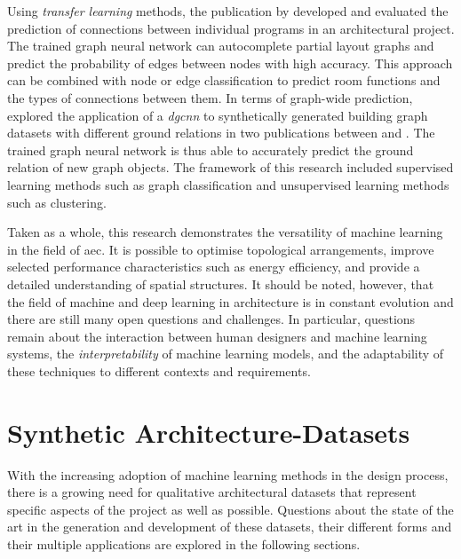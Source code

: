 \documentclass[a4paper, 12pt]{report}
\begin{document}
Using \textit{transfer learning} methods, the publication  by \citeauthor{eisenstadt2022autocompletion} developed and evaluated the prediction of connections between individual programs in an architectural project. The trained graph neural network can autocomplete partial layout graphs and predict the probability of edges between nodes with high accuracy. This approach can be combined with node or edge classification to predict room functions and the types of connections between them. In terms of graph-wide prediction, \citeauthor{alymani2022graph} explored the application of a \textit{\acrlong{dgcnn}} to synthetically generated building graph datasets with different ground relations in two publications between \citeyear{alymani2022graph} and \citeyear{alymani2023classifying}. The trained graph neural network is thus able to accurately predict the ground relation of new graph objects. The framework of this research included supervised learning methods such as graph classification and unsupervised learning methods such as clustering.

Taken as a whole, this research demonstrates the versatility of machine learning in the field of \acrlong{aec}. It is possible to optimise topological arrangements, improve selected performance characteristics such as energy efficiency, and provide a detailed understanding of spatial structures. It should be noted, however, that the field of machine and deep learning in architecture is in constant evolution and there are still many open questions and challenges. In particular, questions remain about the interaction between human designers and machine learning systems, the \textit{interpretability} of machine learning models, and the adaptability of these techniques to different contexts and requirements.

\section{Synthetic Architecture-Datasets}\label{sec:synthetic-architecture-datasets}

With the increasing adoption of machine learning methods in the design process, there is a growing need for qualitative architectural datasets that represent specific aspects of the project as well as possible. Questions about the state of the art in the generation and development of these datasets, their different forms and their multiple applications are explored in the following sections.
\end{document}
